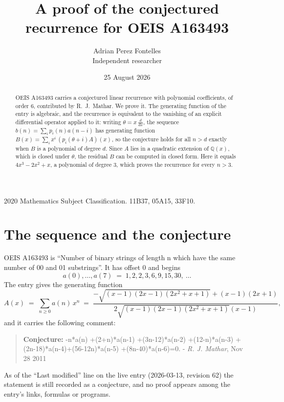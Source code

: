 \documentclass[11pt,a4paper]{article}
\title{A proof of the conjectured recurrence for OEIS A163493}
\author{Adrian Perez Fontelles\\ \small Independent researcher}
\date{25 August 2026}
\theoremstyle{plain}
\theoremstyle{definition}
\begin{document}
\maketitle

\begin{abstract}
OEIS A163493 carries a conjectured linear recurrence with polynomial coefficients, of
order 6, contributed by R.~J.~Mathar. We prove it. The generating function of the
entry is algebraic, and the recurrence is equivalent to the vanishing of an explicit
differential operator applied to it: writing $\theta=x\,\frac{d}{dx}$, the sequence
$b(n)=\sum_{i}p_{i}(n)a(n-i)$ has generating function
$B(x)=\sum_{i}x^{i}\,(p_{i}(\theta+i)A)(x)$, so the conjecture holds for all $n>d$ exactly
when $B$ is a polynomial of degree $d$. Since $A$ lies in a quadratic extension of
$\mathbb{Q}(x)$, which is closed under $\theta$, the residual $B$ can be computed in
closed form. Here it equals $4 x^{3} - 2 x^{2} + x$, a polynomial of degree $3$, which proves
the recurrence for every $n>3$.
\end{abstract}

\noindent\small 2020 Mathematics Subject Classification. 11B37, 05A15, 33F10.\normalsize

\section{The sequence and the conjecture}

OEIS A163493 is ``Number of binary strings of length n which have the same number of 00 and 01 substrings''. It has offset $0$ and begins
\[
a(0),\dots,a(7)\;=\;1, 2, 2, 3, 6, 9, 15, 30,\ \dots
\]
The entry gives the generating function
\begin{equation}\label{eq:gf}
A(x)\;=\;\sum_{n\ge 0} a(n)\,x^{n}\;=\;\frac{- \sqrt{\left(x - 1\right) \left(2 x - 1\right) \left(2 x^{2} + x + 1\right)} + \left(x - 1\right) \left(2 x + 1\right)}{2 \sqrt{\left(x - 1\right) \left(2 x - 1\right) \left(2 x^{2} + x + 1\right)} \left(x - 1\right)} ,
\end{equation}
and it carries the following comment:
\begin{quote}\small
\textbf{Conjecture:} -n*a(n) +(2+n)*a(n-1) +(3n-12)*a(n-2) +(12-n)*a(n-3) +(2n-18)*a(n-4)+(56-12n)*a(n-5) +(8n-40)*a(n-6)=0. - \emph{R. J. Mathar}, Nov 28 2011
\end{quote}
As of the ``Last modified'' line on the live entry (2026-03-13, revision 62) the
statement is still recorded as a conjecture, and no proof appears among the entry's links,
formulas or programs.
\end{document}
